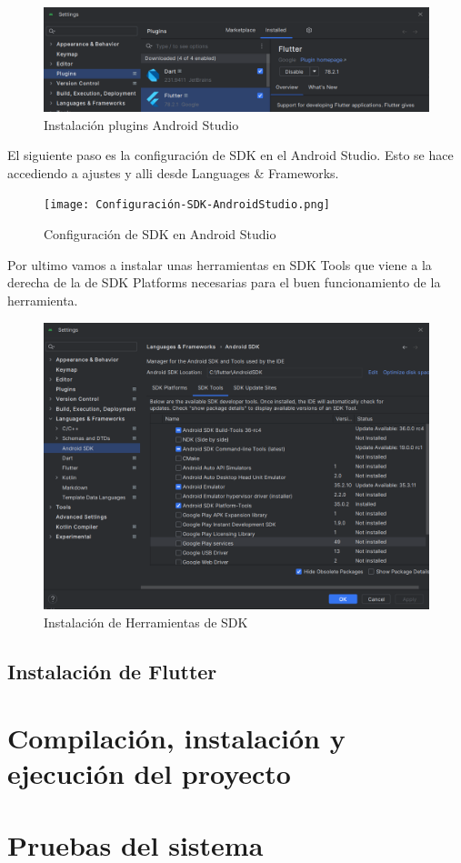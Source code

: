 \begin{figure}[H]
    \centering
    \includegraphics[width=0.8\linewidth]{PlugingsAndroidStudio.png}
    \caption{Instalación plugins Android Studio}
    \label{fig:enter-label}
\end{figure}


El siguiente paso es la configuración de SDK en el Android Studio. Esto se hace accediendo a ajustes y alli desde Languages \& Frameworks.

\begin{figure}[H]
    \centering
    \texttt{[image: Configuración-SDK-AndroidStudio.png]}
    \caption{Configuración de SDK en Android Studio}
    \label{fig:enter-label}
\end{figure}


Por ultimo vamos a instalar unas herramientas en SDK Tools que viene a la derecha de la de SDK Platforms necesarias para el buen funcionamiento de la herramienta.

\begin{figure}[H]
    \centering
    \includegraphics[width=0.8\linewidth]{Configuracion-SDKTools-AndroidStudio.png}
    \caption{Instalación de Herramientas de SDK}
    \label{fig:enter-label}
\end{figure}

\subsection{\textbf{Instalación de Flutter}}

\section{Compilación, instalación y ejecución del proyecto}

\section{Pruebas del sistema}
